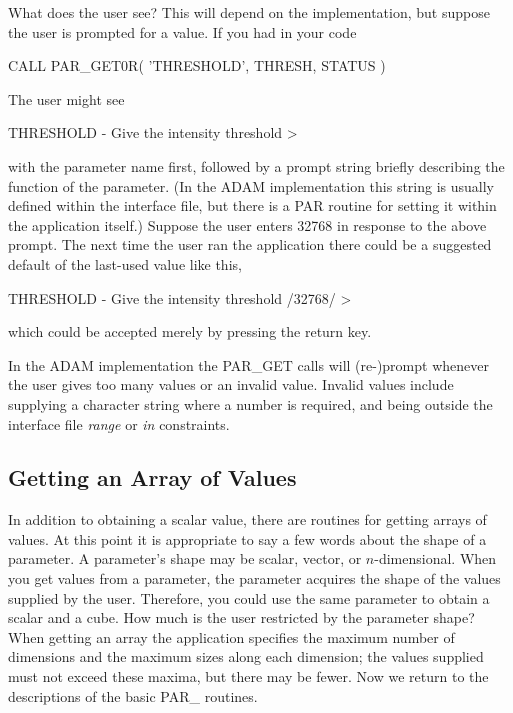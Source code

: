 \documentclass[twoside,11pt,nolof]{starlink}
\begin{document}
What does the user see?  This will depend on the implementation, but
suppose the user is prompted for a value.  If you had in your code

\begin{terminalv}
      CALL PAR_GET0R( 'THRESHOLD', THRESH, STATUS )
\end{terminalv}

The user might see

\begin{terminalv}
THRESHOLD - Give the intensity threshold >
\end{terminalv}

with the parameter name first, followed by a prompt string briefly
describing the function of the parameter.  (In the {\footnotesize ADAM}
implementation this string is usually defined within the interface file,
but there is a PAR routine for setting it within the application
itself.)  Suppose the user enters 32768 in response to the above prompt.
The next time the user ran the application there could be a suggested
default of the last-used value like this,

\begin{terminalv}
THRESHOLD - Give the intensity threshold /32768/ >
\end{terminalv}

which could be accepted merely by pressing the return key.

In the {\footnotesize ADAM} implementation the PAR\_GET calls will
(re-)prompt whenever the user gives too many values or an invalid value.
Invalid values include supplying a character string where a number is
required, and being outside the interface file \emph{range\/} or
\emph{in\/} constraints.

\subsection{Getting an Array of Values}

In addition to obtaining a scalar value, there are routines for getting
arrays of values.  At this point it is appropriate to say a few words
about the shape of a parameter.  A parameter's shape may be scalar,
vector, or $n$-dimensional.  When you get values from a parameter, the
parameter acquires the shape of the values supplied by the user.
Therefore, you could use the same parameter to obtain a scalar and a
cube.  How much is the user restricted by the parameter shape?  When
getting an array the application specifies the maximum number of
dimensions and the maximum sizes along each dimension; the values
supplied must not exceed these maxima, but there may be fewer.  Now we
return to the descriptions of the basic PAR\_ routines.
\end{document}
